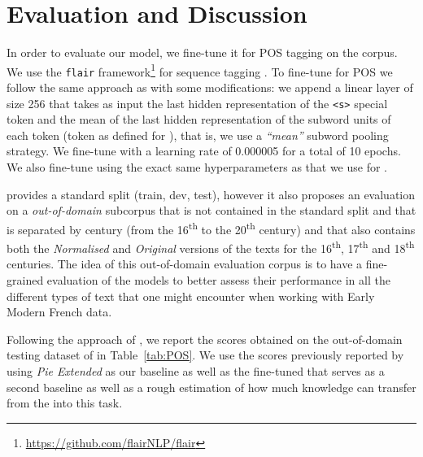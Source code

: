 \section{Evaluation and Discussion}

In order to evaluate our \dalembert model, we fine-tune it for POS tagging on the \freemlpm corpus. We use the \texttt{flair} framework\footnote{\url{https://github.com/flairNLP/flair}} for sequence tagging \cite{akbik-etal-2019-flair}. To fine-tune \dalembert for POS we follow the same approach as  with some modifications: we append a linear layer of size 256 that takes as input the last hidden representation of the \texttt{<s>} special token and the mean of the last hidden representation of the subword units of each token (token as defined for \freemlpm), that is, we use a \emph{``mean''} subword pooling strategy. We fine-tune \dalembert with a learning rate of 0.000005 for a total of 10 epochs. We also fine-tune \camembert using the exact same hyperparameters as that we use for \dalembert.

\freemlpm provides a standard split (train, dev, test), however it also proposes an evaluation on a \emph{out-of-domain} subcorpus that is not contained in the standard split and that is separated by century (from the 16\textsuperscript{th} to the 20\textsuperscript{th} century) and that also contains both the \emph{Normalised} and \emph{Original} versions of the texts for the 16\textsuperscript{th}, 17\textsuperscript{th} and 18\textsuperscript{th} centuries. The idea of this out-of-domain evaluation corpus is to have a fine-grained evaluation of the models to better assess their performance in all the different types of text that one might encounter when working with Early Modern French data.

Following the approach of , we report the scores obtained on the out-of-domain testing dataset of \freemlpm in Table~\ref{tab:POS}. We use the scores previously reported by  using \emph{Pie Extended} as our baseline as well as the fine-tuned \camembert that serves as a second baseline as well as a rough estimation of how much knowledge can \dalembert transfer from the \freemmax into this task.

